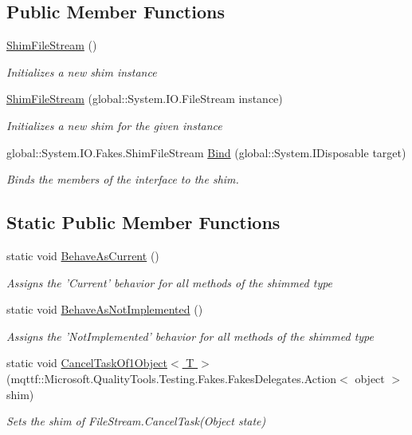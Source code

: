 \subsection*{Public Member Functions}
\begin{DoxyCompactItemize}
\item 
\hyperlink{class_system_1_1_i_o_1_1_fakes_1_1_shim_file_stream_a8f69e6acca4147067a787da8b35e14ae}{Shim\-File\-Stream} ()
\begin{DoxyCompactList}\small\item\em Initializes a new shim instance\end{DoxyCompactList}\item 
\hyperlink{class_system_1_1_i_o_1_1_fakes_1_1_shim_file_stream_a0c4901108f196a37248c5132f8d9ac2a}{Shim\-File\-Stream} (global\-::\-System.\-I\-O.\-File\-Stream instance)
\begin{DoxyCompactList}\small\item\em Initializes a new shim for the given instance\end{DoxyCompactList}\item 
global\-::\-System.\-I\-O.\-Fakes.\-Shim\-File\-Stream \hyperlink{class_system_1_1_i_o_1_1_fakes_1_1_shim_file_stream_a449578948c5d465c1a901826b824bdde}{Bind} (global\-::\-System.\-I\-Disposable target)
\begin{DoxyCompactList}\small\item\em Binds the members of the interface to the shim.\end{DoxyCompactList}\end{DoxyCompactItemize}
\subsection*{Static Public Member Functions}
\begin{DoxyCompactItemize}
\item 
static void \hyperlink{class_system_1_1_i_o_1_1_fakes_1_1_shim_file_stream_ac3314acf998dacf2748f8cd3464450a1}{Behave\-As\-Current} ()
\begin{DoxyCompactList}\small\item\em Assigns the 'Current' behavior for all methods of the shimmed type\end{DoxyCompactList}\item 
static void \hyperlink{class_system_1_1_i_o_1_1_fakes_1_1_shim_file_stream_abc61d16e9c99f26d379adf3098154c81}{Behave\-As\-Not\-Implemented} ()
\begin{DoxyCompactList}\small\item\em Assigns the 'Not\-Implemented' behavior for all methods of the shimmed type\end{DoxyCompactList}\item 
static void \hyperlink{class_system_1_1_i_o_1_1_fakes_1_1_shim_file_stream_ae720729e20762e93667a71642bd7f7aa}{Cancel\-Task\-Of1\-Object$<$ T $>$} (mqttf\-::\-Microsoft.\-Quality\-Tools.\-Testing.\-Fakes.\-Fakes\-Delegates.\-Action$<$ object $>$ shim)
\begin{DoxyCompactList}\small\item\em Sets the shim of File\-Stream.\-Cancel\-Task(\-Object state)\end{DoxyCompactList}\end{DoxyCompactItemize}
